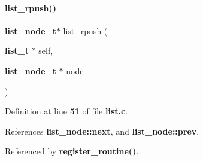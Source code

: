\paragraph{list\+\_\+rpush()}
{\footnotesize\ttfamily \textbf{ list\+\_\+node\+\_\+t}$\ast$ list\+\_\+rpush (\begin{DoxyParamCaption}\item[{\textbf{ list\+\_\+t} $\ast$}]{self,  }\item[{\textbf{ list\+\_\+node\+\_\+t} $\ast$}]{node }\end{DoxyParamCaption})}



Definition at line \textbf{ 51} of file \textbf{ list.\+c}.



References \textbf{ list\+\_\+node\+::next}, and \textbf{ list\+\_\+node\+::prev}.



Referenced by \textbf{ register\+\_\+routine()}.

